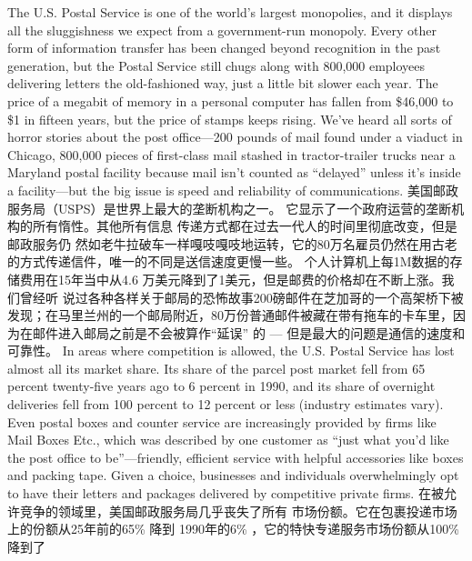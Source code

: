 \begin{paracol}{2}
The U.S. Postal Service is one of the world's largest monopolies,
and it displays all the sluggishness we expect from a government-run monopoly. Every other form of information transfer
has been changed beyond recognition in the past generation,
but the Postal Service still chugs along with 800,000 employees
delivering letters the old-fashioned way, just a little bit slower
each year. The price of a megabit of memory in a personal computer has fallen from \$46,000 to \$1 in fifteen years, but the
price of stamps keeps rising. We've heard all sorts of horror stories about the post office---200 pounds of mail found under a
viaduct in Chicago, 800,000 pieces of first-class mail stashed in
tractor-trailer trucks near a Maryland postal facility because
mail isn't counted as ``delayed'' unless it's inside a facility---but
the big issue is speed and reliability of communications.
\switchcolumn
美国邮政服务局（USPS）是世界上最大的垄断机构之一。
它显示了一个政府运营的垄断机构的所有惰性。其他所有信息
传递方式都在过去一代人的时间里彻底改变，但是邮政服务仍
然如老牛拉破车一样嘎吱嘎吱地运转，它的80万名雇员仍然在用古老的方式传递信件，唯一的不同是送信速度更慢一些。
个人计算机上每1M数据的存储费用在15年当中从4.6 万美元降到了1美元，但是邮费的价格却在不断上涨。我们曾经听
说过各种各样关于邮局的恐怖故事200磅邮件在芝加哥的一个高架桥下被发现；在马里兰州的一个邮局附近，80万份普通邮件被藏在带有拖车的卡车里，因为在邮件进入邮局之前是不会被算作“延误” 的 --- 但是最大的问题是通信的速度和可靠性。
\switchcolumn*
In areas where competition is allowed, the U.S. Postal Service
has lost almost all its market share. Its share of the parcel post
market fell from 65 percent twenty-five years ago to 6 percent
in 1990, and its share of overnight deliveries fell from 100 percent to 12 percent or less (industry estimates vary). Even postal
boxes and counter service are increasingly provided by firms like Mail Boxes Etc., which was described by one customer as
``just what you'd like the post office to be''---friendly, efficient
service with helpful accessories like boxes and packing tape.
Given a choice, businesses and individuals overwhelmingly opt
to have their letters and packages delivered by competitive private firms.
\switchcolumn
在被允许竞争的领域里，美国邮政服务局几乎丧失了所有
市场份额。它在包裹投递市场上的份额从25年前的65\% 降到
1990年的6\% ，它的特快专递服务市场份额从100\% 降到了

\end{paracol}
